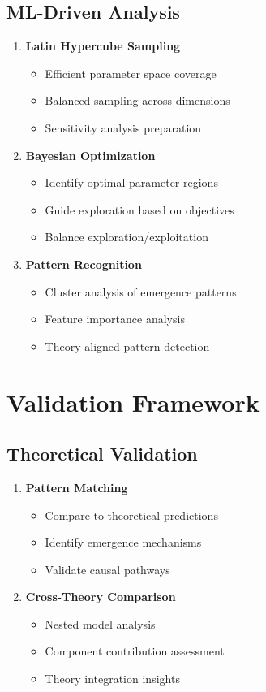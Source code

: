 \documentclass[12pt]{article}
\begin{document}
\subsection{ML-Driven Analysis}
\begin{enumerate}
    \item \textbf{Latin Hypercube Sampling}
    \begin{itemize}
        \item Efficient parameter space coverage
        \item Balanced sampling across dimensions
        \item Sensitivity analysis preparation
    \end{itemize}

    \item \textbf{Bayesian Optimization}
    \begin{itemize}
        \item Identify optimal parameter regions
        \item Guide exploration based on objectives
        \item Balance exploration/exploitation
    \end{itemize}

    \item \textbf{Pattern Recognition}
    \begin{itemize}
        \item Cluster analysis of emergence patterns
        \item Feature importance analysis
        \item Theory-aligned pattern detection
    \end{itemize}
\end{enumerate}

\section{Validation Framework}

\subsection{Theoretical Validation}
\begin{enumerate}
    \item \textbf{Pattern Matching}
    \begin{itemize}
        \item Compare to theoretical predictions
        \item Identify emergence mechanisms
        \item Validate causal pathways
    \end{itemize}

    \item \textbf{Cross-Theory Comparison}
    \begin{itemize}
        \item Nested model analysis
        \item Component contribution assessment
        \item Theory integration insights
    \end{itemize}
\end{enumerate}
\end{document}

